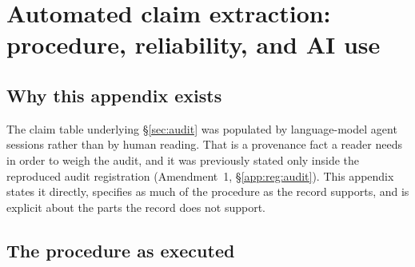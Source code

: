 %
%

\section{Automated claim extraction: procedure, reliability, and AI use}
\label{app:extraction}

\subsection{Why this appendix exists}

The claim table underlying \S\ref{sec:audit} was populated by language-model
agent sessions rather than by human reading. That is a provenance fact a reader
needs in order to weigh the audit, and it was previously stated only inside the
reproduced audit registration (Amendment~1,
\S\ref{app:reg:audit}). This appendix states it directly, specifies as much of
the procedure as the record supports, and is explicit about the parts the
record does not support.

\subsection{The procedure as executed}

